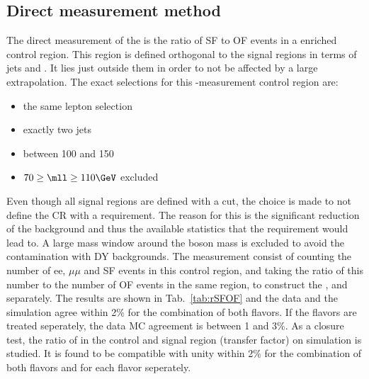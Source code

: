 \subsection{Direct measurement method}\label{sec:rsfofDirect}
The direct measurement of the \Rsfof is the ratio of SF to OF events in a \ttbar enriched control region. 
This region is defined orthogonal to the signal regions in terms of jets and \ptmiss. 
It lies just outside them in order to not be affected by a large extrapolation. 
The exact selections for this \Rsfof-measurement control region are:
\begin{itemize}
    \item the same lepton selection
    \item exactly two jets
    \item \ptmiss between 100 and 150\GeV
    \item $70\geq\mll\geq110\GeV$ excluded
\end{itemize}                                 

Even though all signal regions are defined with a \mttwo cut, the choice is made to not define the \ttbar CR with a \mttwo requirement. 
The reason for this is the significant reduction of the \ttbar background and thus the available statistics that the \mttwo requirement would lead to.
A large mass window around the \PZ boson mass is excluded to avoid the contamination with DY backgrounds. 
The measurement consist of counting the number of ee, $\mu\mu$ and SF events in this control region, and taking the ratio of this number to the number of OF events in the same region, to construct the \Reeof, \Rmmof and \Rsfof separately. 
The results are shown in Tab.~\ref{tab:rSFOF} and the data and the simulation agree within 2\% for the combination of both flavors. 
If the flavors are treated seperately, the data MC agreement is between 1 and 3\%. 
As a closure test, the ratio of \Rsfof in the control and signal region (transfer factor) on simulation is studied. 
It is found to be compatible with unity within 2\%  for the combination of both flavors and for each flavor seperately.

